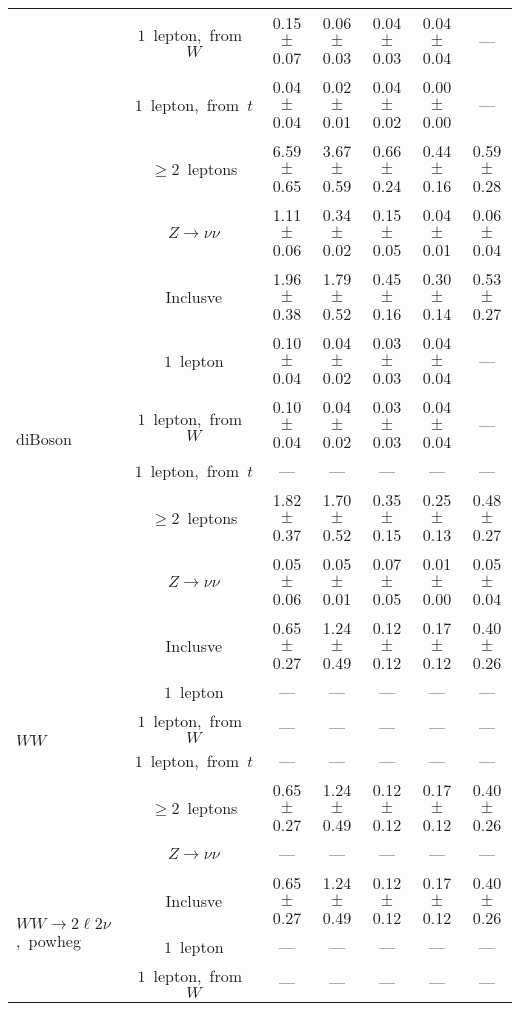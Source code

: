 \documentclass{article}
\begin{document}
\begin{longtable}{|l|c|c|c|c|c|c|}
 & $1$~lepton,~from~$W$  & 0.15 $\pm$ 0.07  & 0.06 $\pm$ 0.03  & 0.04 $\pm$ 0.03  & 0.04 $\pm$ 0.04  & --- \\* 
 & $1$~lepton,~from~$t$  & 0.04 $\pm$ 0.04  & 0.02 $\pm$ 0.01  & 0.04 $\pm$ 0.02  & 0.00 $\pm$ 0.00  & --- \\* 
 & $\ge2$~leptons  & 6.59 $\pm$ 0.65  & 3.67 $\pm$ 0.59  & 0.66 $\pm$ 0.24  & 0.44 $\pm$ 0.16  & 0.59 $\pm$ 0.28 \\* 
 & $Z\rightarrow\nu\nu$  & 1.11 $\pm$ 0.06  & 0.34 $\pm$ 0.02  & 0.15 $\pm$ 0.05  & 0.04 $\pm$ 0.01  & 0.06 $\pm$ 0.04 \\* 
\hline 
\multirow{6}{*}{diBoson} & Inclusve  & 1.96 $\pm$ 0.38  & 1.79 $\pm$ 0.52  & 0.45 $\pm$ 0.16  & 0.30 $\pm$ 0.14  & 0.53 $\pm$ 0.27 \\* 
 & $1$~lepton  & 0.10 $\pm$ 0.04  & 0.04 $\pm$ 0.02  & 0.03 $\pm$ 0.03  & 0.04 $\pm$ 0.04  & --- \\* 
 & $1$~lepton,~from~$W$  & 0.10 $\pm$ 0.04  & 0.04 $\pm$ 0.02  & 0.03 $\pm$ 0.03  & 0.04 $\pm$ 0.04  & --- \\* 
 & $1$~lepton,~from~$t$  & ---  & ---  & ---  & ---  & --- \\* 
 & $\ge2$~leptons  & 1.82 $\pm$ 0.37  & 1.70 $\pm$ 0.52  & 0.35 $\pm$ 0.15  & 0.25 $\pm$ 0.13  & 0.48 $\pm$ 0.27 \\* 
 & $Z\rightarrow\nu\nu$  & 0.05 $\pm$ 0.06  & 0.05 $\pm$ 0.01  & 0.07 $\pm$ 0.05  & 0.01 $\pm$ 0.00  & 0.05 $\pm$ 0.04 \\* 
\hline 
\multirow{6}{*}{$WW$} & Inclusve  & 0.65 $\pm$ 0.27  & 1.24 $\pm$ 0.49  & 0.12 $\pm$ 0.12  & 0.17 $\pm$ 0.12  & 0.40 $\pm$ 0.26 \\* 
 & $1$~lepton  & ---  & ---  & ---  & ---  & --- \\* 
 & $1$~lepton,~from~$W$  & ---  & ---  & ---  & ---  & --- \\* 
 & $1$~lepton,~from~$t$  & ---  & ---  & ---  & ---  & --- \\* 
 & $\ge2$~leptons  & 0.65 $\pm$ 0.27  & 1.24 $\pm$ 0.49  & 0.12 $\pm$ 0.12  & 0.17 $\pm$ 0.12  & 0.40 $\pm$ 0.26 \\* 
 & $Z\rightarrow\nu\nu$  & ---  & ---  & ---  & ---  & --- \\* 
\hline 
\multirow{6}{*}{$WW{\rightarrow}2\ell2\nu$,~powheg} & Inclusve  & 0.65 $\pm$ 0.27  & 1.24 $\pm$ 0.49  & 0.12 $\pm$ 0.12  & 0.17 $\pm$ 0.12  & 0.40 $\pm$ 0.26 \\* 
 & $1$~lepton  & ---  & ---  & ---  & ---  & --- \\* 
 & $1$~lepton,~from~$W$  & ---  & ---  & ---  & ---  & --- \\* 

\end{longtable}
\end{document}
